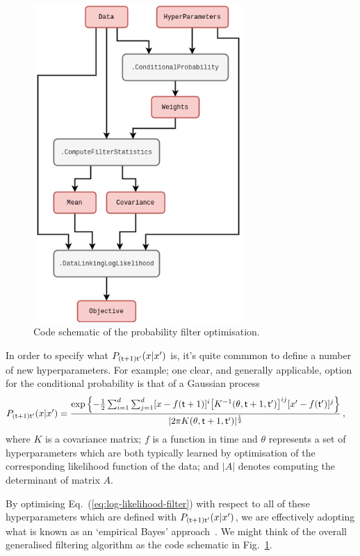 \begin{figure}[h]
\centering
\includegraphics[width=8cm]{images/chapter-4-prob-filter-code.drawio.png}
\caption{Code schematic of the probability filter optimisation.}
\label{fig:prob-filter-code}
\end{figure} 

In order to specify what $P_{({\sf t}+1){\sf t}'}(x\vert x')$ is, it's quite commmon to define a number of new hyperparameters. For example; one clear, and generally applicable, option for the conditional probability is that of a Gaussian process 
\begin{align}
P_{({\sf t}+1){\sf t}'}(x\vert x') &= \frac{{\rm exp}\left\{ -\frac{1}{2}\sum^d_{i=1}\sum^d_{j=1}[x-f({\sf t}+1)]^i \big[ K^{-1}(\theta , {\sf t}+1,{\sf t}')\big]^{ij}[x'-f({\sf t}')]^j  \right\}}{\vert 2\pi K(\theta , {\sf t}+1,{\sf t}') \vert^{\frac{1}{2}}} \label{eq:gaussian-process-cond-prob}\,,
\end{align}
where $K$ is a covariance matrix; $f$ is a function in time and $\theta$ represents a set of hyperparameters which are both typically learned by optimisation of the corresponding likelihood function of the data; and $\vert A\vert$ denotes computing the determinant of matrix $A$. 

By optimising Eq.~(\ref{eq:log-likelihood-filter}) with respect to all of these hyperparameters which are defined with $P_{({\sf t}+1){\sf t}'}(x\vert x')$, we are effectively adopting what is known as an `empirical Bayes' approach~\cite{murphy2012machine, mackay2003information}. We might think of the overall generalised filtering algorithm as the code schematic in Fig.~\ref{fig:prob-filter-code}.

